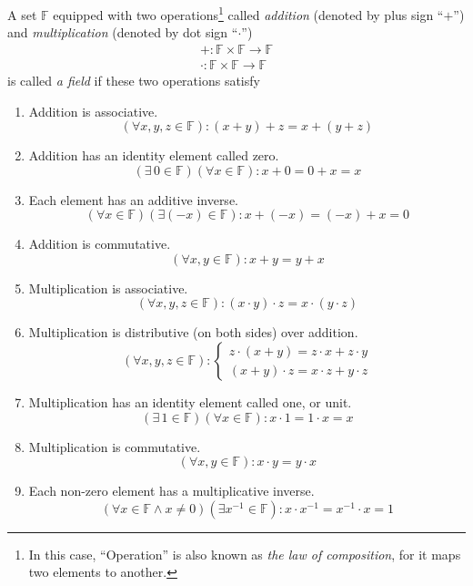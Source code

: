 \begin{definition}[Field]
	A set $\mathbb{F}$ equipped with two operations\footnote{In this case, ``Operation'' is also known as \textit{the law of composition}, for it maps two elements to another.} called \textit{addition} (denoted by plus sign ``$+$'') and \textit{multiplication} (denoted by dot sign ``$\cdot$'')
	\[
		\begin{split}
			+: \mathbb{F}\times\mathbb{F}\to\mathbb{F} \\
			\cdot: \mathbb{F}\times\mathbb{F}\to\mathbb{F}
		\end{split}
	\]
	is called \textit{a field} if these two operations satisfy
	\begin{enumerate}[label = (\arabic*)]
		\item Addition is associative.\label{field:addition-associative}
		      \[
			      (\forall x, y, z\in\mathbb{F}): (x + y) + z = x + (y + z)
		      \]
		\item Addition has an identity element called zero.\label{field:additive-identity}
		      \[
			      (\exists\,0\in\mathbb{F})(\forall x\in\mathbb{F}): x + 0 = 0 + x = x
		      \]
		\item Each element has an additive inverse.\label{field:additive-inverse}
		      \[
			      (\forall x\in\mathbb{F})(\exists (-x)\in\mathbb{F}): x + (-x) = (-x) + x = 0
		      \]
		\item Addition is commutative.\label{field:addition-commutative}
		      \[
			      (\forall x,y\in\mathbb{F}): x + y = y + x
		      \]
		\item Multiplication is associative.\label{field:multiplication-association}
		      \[
			      (\forall x, y, z\in\mathbb{F}): (x\cdot y)\cdot z = x\cdot (y\cdot z)
		      \]
		\item Multiplication is distributive (on both sides) over addition.\label{field:distributive}
		      \[
			      (\forall x, y, z\in\mathbb{F}):
			      \begin{cases}
				      z\cdot (x + y) = z\cdot x + z\cdot y \\
				      (x + y)\cdot z = x\cdot z + y\cdot z
			      \end{cases}
		      \]
		\item Multiplication has an identity element called one, or unit.\label{field:multiplication-identity}
		      \[
			      (\exists\,1\in\mathbb{F})(\forall x\in\mathbb{F}): x\cdot 1 = 1\cdot x = x
		      \]
		\item Multiplication is commutative.\label{field:multiplication-commutative}
		      \[
			      (\forall x, y\in\mathbb{F}): x\cdot y = y\cdot x
		      \]
		\item Each non-zero element has a multiplicative inverse.\label{field:multiplicative-inverse}
		      \[
			      (\forall x\in\mathbb{F} \wedge x\ne 0)(\exists x^{-1}\in\mathbb{F}): x\cdot x^{-1} = x^{-1}\cdot x = 1
		      \]
	\end{enumerate}
\end{definition}

